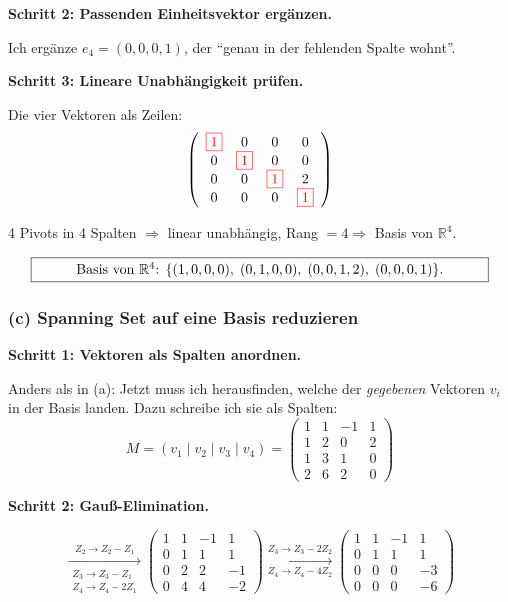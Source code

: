 \documentclass[a4paper,12pt]{article}
\newcommand{\piv}[1]{{\color{red}\boxed{#1}}}
\begin{document}
\textbf{Schritt 2: Passenden Einheitsvektor erg\"anzen.}

Ich erg\"anze $e_4 = (0,0,0,1)$, der ``genau in der fehlenden Spalte wohnt''.

\textbf{Schritt 3: Lineare Unabh\"angigkeit pr\"ufen.}

Die vier Vektoren als Zeilen:
\[
\left(\begin{array}{cccc}
\piv{1} & 0 & 0 & 0 \\
0 & \piv{1} & 0 & 0 \\
0 & 0 & \piv{1} & 2 \\
0 & 0 & 0 & \piv{1}
\end{array}\right)
\]

4 Pivots in 4 Spalten $\Rightarrow$ linear unabh\"angig, Rang $= 4 \Rightarrow$ Basis von $\mathbb{R}^4$.

\[
\fbox{\parbox{0.93\textwidth}{\centering
Basis von $\mathbb{R}^4$: $\{(1,0,0,0),\; (0,1,0,0),\; (0,0,1,2),\; (0,0,0,1)\}.$
}}
\]

\subsubsection*{(c) Spanning Set auf eine Basis reduzieren}

\textbf{Schritt 1: Vektoren als \textbf{Spalten} anordnen.}

Anders als in (a): Jetzt muss ich herausfinden, welche der \textit{gegebenen} Vektoren $v_i$ in der Basis landen. Dazu schreibe ich sie als Spalten:
\[
M = (v_1 \mid v_2 \mid v_3 \mid v_4) =
\left(\begin{array}{cccc}
1 & 1 & -1 & 1 \\
1 & 2 & 0 & 2 \\
1 & 3 & 1 & 0 \\
2 & 6 & 2 & 0
\end{array}\right)
\]

\textbf{Schritt 2: Gau\ss-Elimination.}

\[
\xrightarrow[\substack{Z_3 \to Z_3 - Z_1 \\ Z_4 \to Z_4 - 2Z_1}]{Z_2 \to Z_2 - Z_1}
\left(\begin{array}{cccc}
1 & 1 & -1 & 1 \\
0 & 1 & 1 & 1 \\
0 & 2 & 2 & -1 \\
0 & 4 & 4 & -2
\end{array}\right)
\xrightarrow[Z_4 \to Z_4 - 4Z_2]{Z_3 \to Z_3 - 2Z_2}
\left(\begin{array}{cccc}
1 & 1 & -1 & 1 \\
0 & 1 & 1 & 1 \\
0 & 0 & 0 & -3 \\
0 & 0 & 0 & -6
\end{array}\right)
\]
\end{document}
